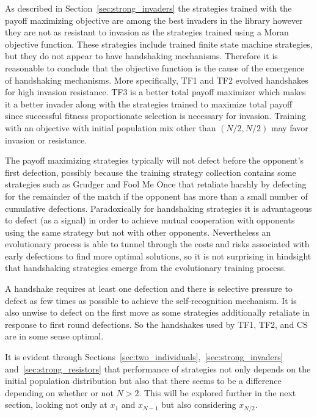 \documentclass[10pt,journal]{IEEEtran}
\begin{document}
As described in Section~\ref{sec:strong_invaders} the strategies trained with
the payoff maximizing objective are among the best invaders in the library
however they are not as resistant to invasion as the strategies trained using a
Moran objective function. These strategies include trained finite state machine
strategies, but they do not appear to have handshaking mechanisms. Therefore it
is reasonable to conclude that the objective function is the cause of the
emergence of handshaking mechanisms. More specifically, TF1 and TF2 evolved
handshakes for high invasion resistance. TF3 is a better total payoff maximizer
which makes it a better invader along with the strategies
trained to maximize total payoff since successful fitness proportionate selection
is necessary for invasion. Training with an objective with initial population
mix other than $(N/2, N/2)$ may favor invasion or resistance.

The payoff maximizing strategies typically will not defect before the opponent's
first defection, possibly because the training strategy collection contains some
strategies such as Grudger and Fool Me Once that retaliate harshly by defecting
for the remainder of the match if the opponent has more than a small number of
cumulative defections. Paradoxically for handshaking strategies
it is advantageous to defect (as a signal)
in order to achieve mutual cooperation with opponents using the same strategy
but not with other opponents. Nevertheless an evolutionary process is able to
tunnel through the costs and risks associated with early defections to find more
optimal solutions, so it is not surprising in hindsight that handshaking
strategies emerge from the evolutionary training process.

A handshake requires at least one defection and there is
selective pressure to defect as few times as possible to achieve the
self-recognition mechanism. It is also unwise to defect on the first move as
some strategies additionally retaliate in response to first round defections. So the
handshakes used by TF1, TF2, and CS are in some sense optimal.

It is evident through
Sections~\ref{sec:two_individuals},~\ref{sec:strong_invaders}
and~\ref{sec:strong_resistors} that performance of strategies not only depends
on the initial population distribution but also that there seems to be a
difference depending on whether or not \(N>2\). This will be explored further in
the next section, looking not only at \(x_1\) and \(x_{N-1}\) but also
considering
\(x_{N/2}\).
\end{document}
